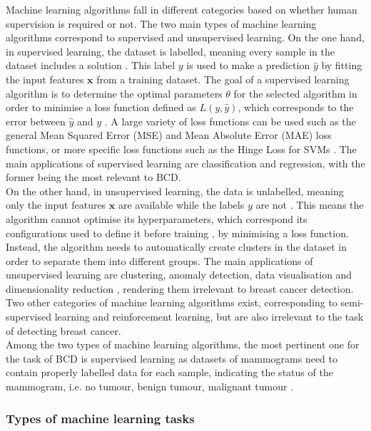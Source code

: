 Machine learning algorithms fall in different categories based on whether human supervision is required or not. The two main types of machine learning algorithms correspond to supervised and unsupervised learning. On the one hand, in supervised learning, the dataset is labelled, meaning every sample in the dataset includes a solution \citep{Caruana2006}. This label $y$ is used to make a prediction $\hat{y}$ by fitting the input features $\textbf{x}$ from a training dataset. The goal of a supervised learning algorithm is to determine the optimal parameters $\theta$ for the selected algorithm in order to minimise a loss function defined as $L(y,\hat{y})$, which corresponds to the error between $\hat{y}$ and $y$ \citep{Litjens2017}. A large variety of loss functions can be used such as the general Mean Squared Error (MSE) and Mean Absolute Error (MAE) loss functions, or more specific loss functions such as the Hinge Loss for SVMs \citep{Geron2019}. The main applications of supervised learning are classification and regression, with the former being the most relevant to BCD.\\

On the other hand, in unsupervised learning, the data is unlabelled, meaning only the input features $\textbf{x}$ are available while the labels $y$ are not \citep{Litjens2017}. This means the algorithm cannot optimise its hyperparameters, which correspond its configurations used to define it before training \citep{Bergstra2013}, by minimising a loss function. Instead, the algorithm needs to automatically create clusters in the dataset in order to separate them into different groups. The main applications of unsupervised learning are clustering, anomaly detection, data visualisation and dimensionality reduction \citep{Geron2019}, rendering them irrelevant to breast cancer detection. Two other categories of machine learning algorithms exist, corresponding to semi-supervised learning and reinforcement learning, but are also irrelevant to the task of detecting breast cancer.\\

Among the two types of machine learning algorithms, the most pertinent one for the task of BCD is supervised learning as datasets of mammograms need to contain properly labelled data for each sample, indicating the status of the mammogram, i.e. no tumour, benign tumour, malignant tumour \citep{Shen2017}.

\subsubsection{Types of machine learning tasks}

